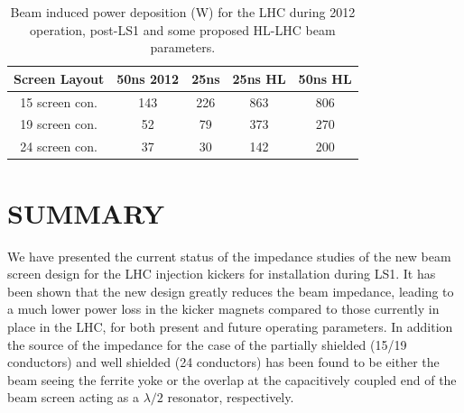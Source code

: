 \documentclass{JAC2003}
\begin{document}
\begin{table}
\caption{Beam induced power deposition (W) for the LHC during 2012 operation, post-LS1 and some proposed HL-LHC beam parameters.}
\label{tab:PowLoss}
\begin{center}
\begin{tabular}{c | c | c | c | c}
Screen Layout &50ns 2012&25ns&25ns HL&50ns HL\\ \hline
15 screen con. & 143 & 226 & 863 & 806 \\ \hline
19 screen con. & 52 & 79 & 373 & 270 \\ \hline
24 screen con. & 37 & 30 & 142 & 200 \\
\end{tabular}
\end{center}
\end{table}

\section{SUMMARY}

We have presented the current status of the impedance studies of the new beam screen design for the LHC injection kickers for installation during LS1. It has been shown that the new design greatly reduces the beam impedance, leading to a much lower power loss in the kicker magnets compared to those currently in place in the LHC, for both present and future operating parameters. In addition the source of the impedance for the case of the partially shielded (15/19 conductors) and well shielded (24 conductors) has been found to be either the beam seeing the ferrite yoke or the overlap at the capacitively coupled end of the beam screen acting as a $\lambda /2 $ resonator, respectively. 
\end{document}
